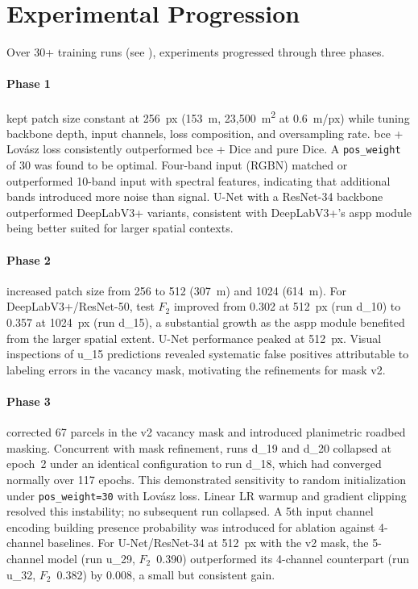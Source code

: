\section{Experimental Progression}
\label{sec:progression}

Over 30+ training runs (see ), experiments progressed through three phases.

\paragraph{Phase 1} kept patch size constant at 256~px (153~m, 23,500~m\textsuperscript{2} at 0.6~m/px) while tuning backbone depth, input channels, loss composition, and oversampling rate. \acrshort{bce} + Lov\'{a}sz loss consistently outperformed \acrshort{bce} + Dice and pure Dice. A \texttt{pos\_weight} of 30 was found to be optimal. Four-band input (RGBN) matched or outperformed 10-band input with spectral features, indicating that additional bands introduced more noise than signal. U-Net with a ResNet-34 backbone outperformed DeepLabV3+ variants, consistent with DeepLabV3+'s \acrshort{aspp} module being better suited for larger spatial contexts.

\paragraph{Phase 2} increased patch size from 256 to 512 (307~m) and 1024 (614~m). For DeepLabV3+/ResNet-50, test $F_2$ improved from 0.302 at 512~px (run d\_10) to 0.357 at 1024~px (run d\_15), a substantial growth as the \acrshort{aspp} module benefited from the larger spatial extent. U-Net performance peaked at 512~px. Visual inspections of u\_15 predictions revealed systematic false positives attributable to labeling errors in the vacancy mask, motivating the refinements for mask v2.

\paragraph{Phase 3} corrected 67 parcels in the v2 vacancy mask and introduced planimetric roadbed masking. Concurrent with mask refinement, runs d\_19 and d\_20 collapsed at epoch~2 under an identical configuration to run d\_18, which had converged normally over 117 epochs. This demonstrated sensitivity to random initialization under \texttt{pos\_weight=30} with Lov\'{a}sz loss. Linear LR warmup and gradient clipping resolved this instability; no subsequent run collapsed. A 5th input channel encoding building presence probability was introduced for ablation against 4-channel baselines. For U-Net/ResNet-34 at 512~px with the v2 mask, the 5-channel model (run u\_29, $F_2$~0.390) outperformed its 4-channel counterpart (run u\_32, $F_2$~0.382) by 0.008, a small but consistent gain.

